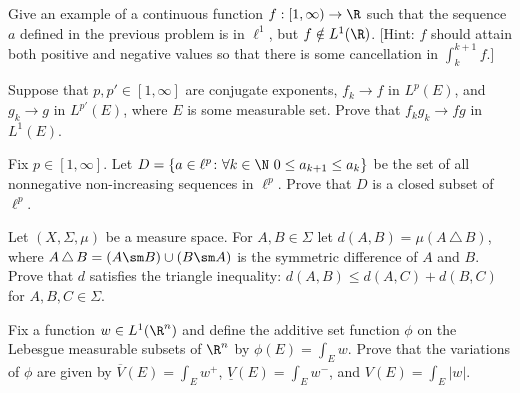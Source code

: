 \begin{hw} \label{hw:50}
Give an example of a continuous function $f: [1, \infty) \to \R$ such that the sequence $a$ defined in the previous problem is in $\ell^1$, but $f \notin L^1(\R)$. [Hint: $f$ should attain both positive and negative values so that there is some cancellation in $\int_k^{k+1} f$.] \\
\end{hw}






\begin{hw} \label{hw:51}
Suppose that $p, p' \in [1,\infty]$ are conjugate exponents, $f_k \to f$ in $L^p(E)$, and $g_k \to g$ in $L^{p'}(E)$, where $E$ is some measurable set. Prove that $f_k g_k \to fg$ in $L^1(E)$. \\
\end{hw}


\begin{hw} \label{hw:52}
Fix $p \in [1,\infty]$. Let $D= \{ a\in \ell^p \colon \forall k\in \N \ 0 \leq a_{k+1} \leq a_ k\}$ be the set of all nonnegative non-increasing sequences in $\ell^p$. Prove that $D$ is a closed subset of $\ell^p$. \\
\end{hw}






\begin{hw} \label{hw:53}
Let $(X,\Sigma,\mu)$ be a measure space. For $A,B \in \Sigma$ let $d(A, B)= \mu(A \,\triangle\, B)$, where $A \,\triangle\, B= (A \sm B)\cup (B \sm A)$ is the symmetric difference of $A$ and $B$. Prove that $d$ satisfies the triangle inequality: $d(A, B) \leq d(A, C) + d(B, C)$ for $A, B, C \in \Sigma$. \\
\end{hw}


\begin{hw} \label{hw:54}
Fix a function $w \in L^1(\R^n)$ and define the additive set function $\phi$ on the Lebesgue measurable subsets of $\R^n$ by $\phi(E)= \int_E w$. Prove that the variations of $\phi$ are given by $\overline{V}(E)= \int_E w^+$, $\underline{V}(E)= \int_E w^-$, and $V(E)= \int_E |w|$. \\
\end{hw}



